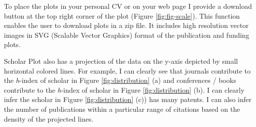 %
% 

To place the plots in your personal CV or on your web page I provide a download button at the top right corner of the plot (Figure \ref{fig:fig-scale}). This function enables the user to download plots in a zip file. It includes high resolution vector images in SVG (Scalable Vector Graphics) format of the publication and funding plots.

Scholar Plot also has a projection of the data on the y-axis depicted by small horizontal colored lines. For example, I can clearly see that journals contribute to the {\it h}-index of scholar in Figure \ref{fig:distribution} (a) and conferences / books contribute to the {\it h}-index of scholar in Figure \ref{fig:distribution} (b). I can clearly infer the scholar in Figure \ref{fig:distribution} (c)) has many patents. I can also infer the number of publications within a particular range of citations based on the density of the projected lines.

